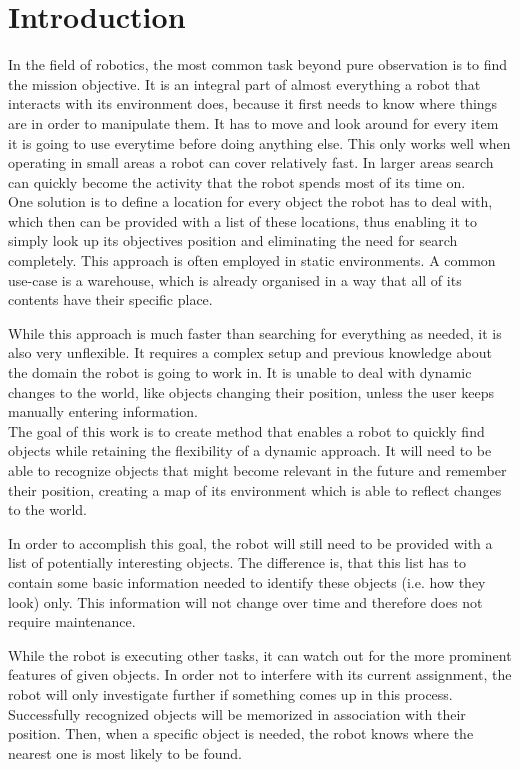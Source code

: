 \chapter{Introduction}
In the field of robotics, the most common task beyond pure observation is to find the mission objective. It is an integral part of almost everything a robot that interacts with its environment does, because it first needs to know where things are in order to manipulate them. It has to move and look around for every item it is going to use everytime before doing anything else. This only works well when operating in small areas a robot can cover relatively fast. In larger areas search can quickly become the activity that the robot spends most of its time on. \\

One solution is to define a location for every object the robot has to deal with, which then can be provided with a list of these locations, thus enabling it to simply look up its objectives position and eliminating the need for search completely. This approach is often employed in static environments. A common use-case is a warehouse, which is already organised in a way that all of its contents have their specific place.

While this approach is much faster than searching for everything as needed, it is also very unflexible. It requires a complex setup and previous knowledge about the domain the robot is going to work in. It is unable to deal with dynamic changes to the world, like objects changing their position, unless the user keeps manually entering information. \\

The goal of this work is to create method that enables a robot to quickly find objects while retaining the flexibility of a dynamic approach. It will need to be able to recognize objects that might become relevant in the future and remember their position, creating a map of its environment which is able to reflect changes to the world.

In order to accomplish this goal, the robot will still need to be provided with a list of potentially interesting objects. The difference is, that this list has to contain some basic information needed to identify these objects (i.e. how they look) only. This information will not change over time and therefore does not require maintenance.

While the robot is executing other tasks, it can watch out for the more prominent features of given objects. In order not to interfere with its current assignment, the robot will only investigate further if something comes up in this process. Successfully recognized objects will be memorized in association with their position. Then, when a specific object is needed, the robot knows where the nearest one is most likely to be found. \\

